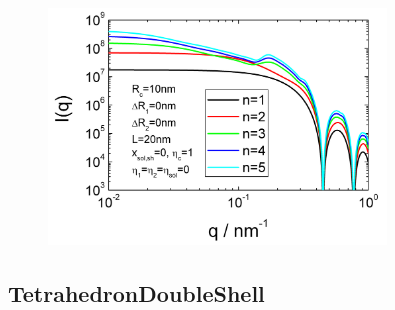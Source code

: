 \begin{figure}[htb]
\begin{center}
\includegraphics[width=0.8\textwidth,height=0.5\textwidth]{../images/form_factor/cluster/DoubleShellChain.png}
\end{center}
\caption{}
\label{fig:DoubleShellChain}
\end{figure}


\clearpage
\subsection{TetrahedronDoubleShell}
\label{sect:TetrahedronDoubleShell}
~\\

